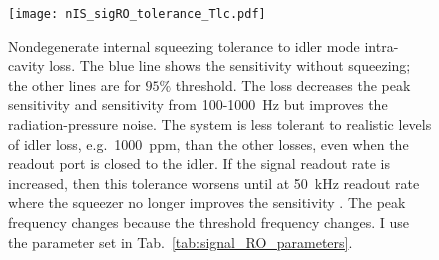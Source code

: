 \begin{figure}
    \centering
    \texttt{[image: nIS\_sigRO\_tolerance\_Tlc.pdf]}
    \caption{Nondegenerate internal squeezing tolerance to idler mode intra-cavity loss. The blue line shows the sensitivity without squeezing; the other lines are for $95\%$ threshold.
    The loss decreases the peak sensitivity and sensitivity from 100-1000~Hz but improves the radiation-pressure noise. The system is less tolerant to realistic levels of idler loss, e.g.\ 1000~ppm, than the other losses, even when the readout port is closed to the idler. If the signal readout rate is increased, then this tolerance worsens until at 50~kHz readout rate where the squeezer no longer improves the sensitivity . The peak frequency changes because the threshold frequency changes. I use the parameter set in Tab.~\ref{tab:signal_RO_parameters}.}
    \label{fig:nIS_sigRO_tolerance_Tlc}
\end{figure}

